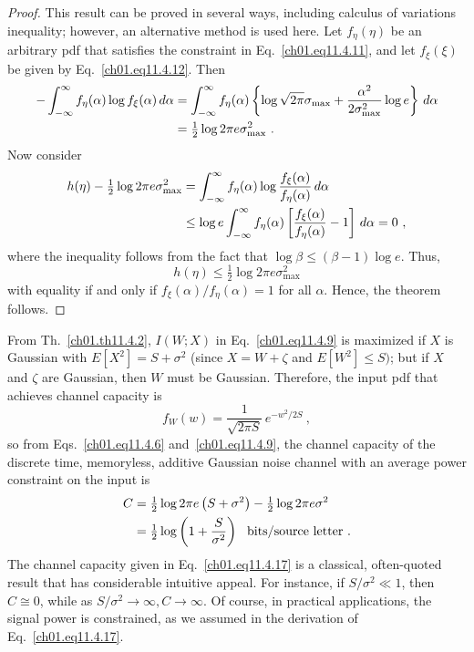 \begin{proof}
This result can be proved in several ways, including calculus of
variations~\cite{WenWangetal2005} inequality; however, an
alternative method is used here.
Let $f_\eta(\eta)$ be an arbitrary pdf
that satisfies the constraint in Eq.~\eqref{ch01.eq11.4.11},
and let $f_\xi(\xi) $ be given by Eq.~\eqref{ch01.eq11.4.12}.
Then
\begin{align}
  - \int^\infty_{-\infty} f_\eta(\alpha)
  \log f_\xi(\alpha) \, d\alpha
  & =
  \int^\infty_{-\infty} f_\eta(\alpha)
  \left\{\log \sqrt{2\pi} \sigma_{\max} +
  \frac{\alpha^2}{2 \sigma^2_{\max}} \log e
  \right\} \,d\alpha
  \notag\\
  &= \tfrac{1}{2} \log 2 \pi e \sigma^2_{\max}~.
\label{ch01.eq11.4.13}
\end{align}
Now consider
\begin{align}
  h(\eta) - \tfrac{1}{2} \log 2 \pi e \sigma^2_{\max}
  & =
  \int^\infty_{-\infty} f_\eta(\alpha)
  \log \frac{f_\xi(\alpha)}{f_\eta(\alpha)} \, d\alpha
  \notag\\
  & \leq \log e \int^\infty_{-\infty} f_\eta(\alpha)
  \left[  \frac{f_\xi(\alpha)}{f_\eta (\alpha)} -1
  \right] \,d\alpha = 0~,
\label{ch01.eq11.4.14}
\end{align}
where the inequality follows from the fact that
$\log \beta \leq (\beta - 1) \log e $. Thus,
\begin{equation}
 h(\eta) \leq \tfrac{1}{2} \log 2\pi e \sigma^2_{\max}
\label{ch01.eq11.4.15}
\end{equation}
with equality if and only if $f_\xi(\alpha) / f_\eta (\alpha) =1 $
for all $\alpha$.  Hence, the theorem follows.
\end{proof}

From Th.~\ref{ch01.th11.4.2}, $I(W;X)$ in Eq.~\eqref{ch01.eq11.4.9}
is maximized if $X$ is Gaussian
with $E[X^2] = S + \sigma^2 $ (since $X= W + \zeta $
and
$ E [W^2] \leq S)$; but if $X$ and $\zeta$ are
Gaussian, then $W$ must be Gaussian. Therefore, the input pdf that achieves
channel capacity is
\begin{equation}
  f_W (w) = \frac{1} { \sqrt{2\pi S} }
  \, e^{- w^2 / 2 S}~,
\label{ch01.eq11.4.16}
\end{equation}
so from Eqs.~\eqref{ch01.eq11.4.6} and~\eqref{ch01.eq11.4.9}, the channel
capacity of the discrete time,
memoryless, additive Gaussian noise channel with an average power constraint
on the input is
\begin{align}
 C & = \tfrac{1}{2} \log 2 \pi e \left(S+\sigma^2\right)
 - \tfrac{1}{2} \log 2 \pi e \sigma^2
 \notag\\
 &=  \tfrac{1}{2} \log
 \left( 1 + \frac{S}{\sigma^2} \right)
 \ \ \textrm{bits/source letter}~.
\label{ch01.eq11.4.17}
\end{align}
The channel capacity given in Eq.~\eqref{ch01.eq11.4.17} is a classical,
often-quoted result
that has considerable intuitive appeal. For instance, if $S/\sigma^2 \ll 1$,
then $ C \cong 0 $,
while as $ S / \sigma^2 \rightarrow \infty, C \rightarrow \infty $.
Of course, in practical applications, the signal
power is constrained, as we assumed in the derivation
of Eq.~\eqref{ch01.eq11.4.17}.

